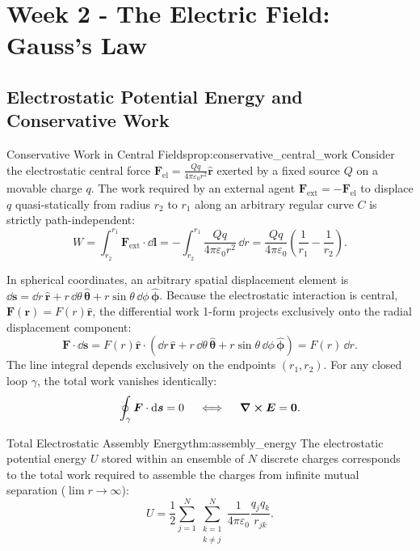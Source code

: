 \section { Week 2 - The Electric Field: Gauss’s Law}
\subsection[Electrostatic Potential Energy and Conservative Work]{Electrostatic Potential Energy and Conservative Work}

\begin{proposition}{Conservative Work in Central Fields}{prop:conservative_central_work}
Consider the electrostatic central force $\bm{F}_{\text{el}} = \frac{Q q}{4\pi\varepsilon_0 r^2}\hat{\bm{r}}$ exerted by a fixed source $Q$ on a movable charge $q$. The work required by an external agent $\bm{F}_{\text{ext}} = -\bm{F}_{\text{el}}$ to displace $q$ quasi-statically from radius $r_2$ to $r_1$ along an arbitrary regular curve $C$ is strictly path-independent:
\begin{equation}
    W = \int_{r_2}^{r_1} \bm{F}_{\text{ext}} \cdot \dd\bm{l} = -\int_{r_2}^{r_1} \frac{Q q}{4\pi\varepsilon_0 r^2} \, \dd r = \frac{Q q}{4\pi\varepsilon_0} \left( \frac{1}{r_1} - \frac{1}{r_2} \right).
\end{equation}
\end{proposition}

\begin{proofbox}
In spherical coordinates, an arbitrary spatial displacement element is $\dd\bm{s} = \dd r\,\hat{\bm{r}} + r\,\dd\theta\,\hat{\bm{\theta}} + r\sin\theta\,\dd\phi\,\hat{\bm{\phi}}$. Because the electrostatic interaction is central, $\bm{F}(\bm{r}) = F(r)\hat{\bm{r}}$, the differential work 1-form projects exclusively onto the radial displacement component:
\begin{equation}
    \bm{F} \cdot \dd\bm{s} = F(r)\hat{\bm{r}} \cdot (\dd r\,\hat{\bm{r}} + r\,\dd\theta\,\hat{\bm{\theta}} + r\sin\theta\,\dd\phi\,\hat{\bm{\phi}}) = F(r)\,\dd r.
\end{equation}
The line integral depends exclusively on the endpoints $(r_1, r_2)$. For any closed loop $\gamma$, the total work vanishes identically:
\begin{equation}
    \oint_\gamma \bm{F} \cdot \dd\bm{s} = 0 \quad \iff \quad \curl{\bm{E}} = \bm{0}.
\end{equation}
\end{proofbox}

\begin{theorem}{Total Electrostatic Assembly Energy}{thm:assembly_energy}
The electrostatic potential energy $U$ stored within an ensemble of $N$ discrete charges corresponds to the total work required to assemble the charges from infinite mutual separation ($\lim r \to \infty$):
\begin{equation}
    U = \frac{1}{2} \sum_{j=1}^N \sum_{\substack{k=1 \\ k \neq j}}^N \frac{1}{4\pi\varepsilon_0} \frac{q_j q_k}{r_{jk}}.
\end{equation}
\end{theorem}

